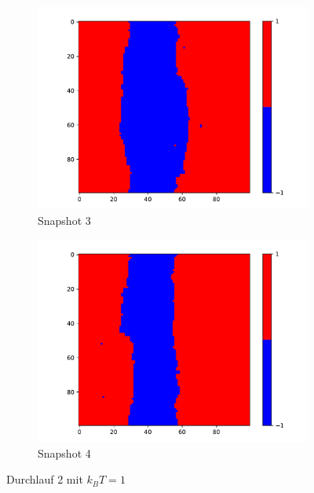 \begin{figure}
    \begin{subfigure}{0.45\textwidth}
      \centering
      \includegraphics[width=\linewidth]{images/Ising1_3_copy.pdf}
      \caption{Snapshot 3}
      \label{fig:image3}
    \end{subfigure}
    \hfill
    \begin{subfigure}{0.45\textwidth}
      \centering
      \includegraphics[width=\linewidth]{images/Ising1_4_copy.pdf}
      \caption{Snapshot 4}
      \label{fig:image4}
    \end{subfigure}
    \caption{Durchlauf 2 mit $k_BT = 1$}
    \label{fig:two_by_two}
  \end{figure}

